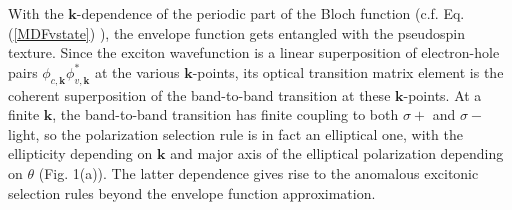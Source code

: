 \documentclass[prb,twocolumn,amsmath,amssymb,superscriptaddress,showpacs]{revtex4}
\begin{document}
With the $\mathbf k$-dependence of the periodic part of the Bloch function (c.f. Eq. (\ref{MDFvstate}) ), the envelope function gets entangled with the pseudospin texture. Since the exciton wavefunction is a linear superposition of electron-hole pairs $\phi_{c,\mathbf{k}}\phi^*_{v,\mathbf{k}}$ at the various $\mathbf{k}$-points, its optical transition matrix element is  the coherent superposition of the band-to-band transition at these $\mathbf{k}$-points.
At a finite $\mathbf k$, the band-to-band transition has finite coupling to both $\sigma+$ and $\sigma-$ light, so the polarization selection rule is in fact an elliptical one, with the ellipticity depending on $\mathbf k$ and major axis of the elliptical polarization depending on $\theta$ (Fig. 1(a)). The latter dependence gives rise to the anomalous excitonic selection rules beyond the envelope function approximation.
\end{document}
